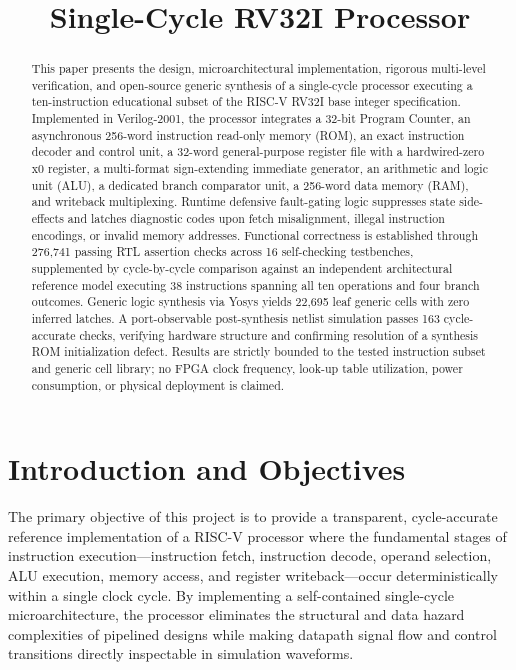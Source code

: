 \documentclass[conference]{IEEEtran}
\title{Single-Cycle RV32I Processor}
\author{
\IEEEauthorblockN{Viraj, Kaustubh, Pratyush, Bhargav and Rudraksh}
\IEEEauthorblockA{Department of Computer Applications / Computer Science and Engineering\\
Institution and Department: Confirm before formal submission}
}
\begin{document}
\maketitle

\begin{abstract}
This paper presents the design, microarchitectural implementation, rigorous multi-level verification, and open-source generic synthesis of a single-cycle processor executing a ten-instruction educational subset of the RISC-V RV32I base integer specification. Implemented in Verilog-2001, the processor integrates a 32-bit Program Counter, an asynchronous 256-word instruction read-only memory (ROM), an exact instruction decoder and control unit, a 32-word general-purpose register file with a hardwired-zero x0 register, a multi-format sign-extending immediate generator, an arithmetic and logic unit (ALU), a dedicated branch comparator unit, a 256-word data memory (RAM), and writeback multiplexing. Runtime defensive fault-gating logic suppresses state side-effects and latches diagnostic codes upon fetch misalignment, illegal instruction encodings, or invalid memory addresses. Functional correctness is established through 276,741 passing RTL assertion checks across 16 self-checking testbenches, supplemented by cycle-by-cycle comparison against an independent architectural reference model executing 38 instructions spanning all ten operations and four branch outcomes. Generic logic synthesis via Yosys yields 22,695 leaf generic cells with zero inferred latches. A port-observable post-synthesis netlist simulation passes 163 cycle-accurate checks, verifying hardware structure and confirming resolution of a synthesis ROM initialization defect. Results are strictly bounded to the tested instruction subset and generic cell library; no FPGA clock frequency, look-up table utilization, power consumption, or physical deployment is claimed.
\end{abstract}

\section{Introduction and Objectives}
The primary objective of this project is to provide a transparent, cycle-accurate reference implementation of a RISC-V processor where the fundamental stages of instruction execution---instruction fetch, instruction decode, operand selection, ALU execution, memory access, and register writeback---occur deterministically within a single clock cycle. By implementing a self-contained single-cycle microarchitecture, the processor eliminates the structural and data hazard complexities of pipelined designs while making datapath signal flow and control transitions directly inspectable in simulation waveforms.
\end{document}
